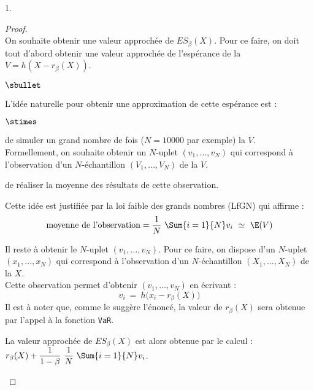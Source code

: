 \begin{noliste}{1.}
  \begin{proof}~\\%
    On souhaite obtenir une valeur approchée de $ES_{\beta}(X)$. Pour
    ce faire, on doit tout d'abord obtenir une valeur approchée de
    l'espérance de la \var $V = h(X- r_\beta(X))$.
    \begin{noliste}{$\sbullet$}
    \item L'idée naturelle pour obtenir une approximation de cette
      espérance est :
      \begin{noliste}{$\stimes$}
      \item de simuler un grand nombre de fois ($N = 10000$ par
        exemple) la \var $V$.\\
        Formellement, on souhaite obtenir un $N$-uplet $(v_1,
        \ldots, v_N)$ qui correspond à l'observation d'un
        $N$-échantillon $(V_1, \ldots, V_N)$ de la \var $V$.
      \item de réaliser la moyenne des résultats de cette
        observation.
      \end{noliste}
      Cette idée est justifiée par la loi faible des grands nombres
      (LfGN) qui affirme :
      \[
      \mbox{moyenne de l'observation} = \dfrac{1}{N} \ \Sum{i =
        1}{N} v_i \ \simeq \ \E(V)
      \]

    \item Il reste à obtenir le $N$-uplet $(v_1, \ldots, v_N)$. Pour
      ce faire, on dispose d'un $N$-uplet $(x_1, \ldots, x_N)$ qui
      correspond à l'observation d'un $N$-échantillon $(X_1, \ldots,
      X_N)$ de la \var $X$.\\
      Cette observation permet d'obtenir $(v_1, \hdots, v_N)$ en 
      écrivant :
      \[
      v_i \ = \ h\big(x_i - r_{\beta}(X)\big)
      \]
      Il est à noter que, comme le suggère l'énoncé, la valeur de
      $r_{\beta}(X)$ sera obtenue par l'appel à la fonction {\tt VaR}.

    \item La valeur approchée de $ES_{\beta}(X)$ est alors obtenue par
      le calcul : $r_{\beta}(X) + \dfrac{1}{1-\beta} \ \dfrac{1}{N} \
      \Sum{i = 1}{N} v_i$.


\end{noliste}
\end{proof}
\end{noliste}
